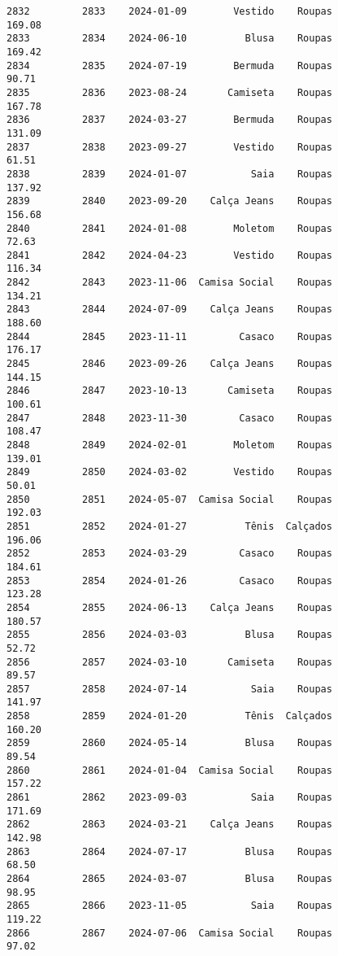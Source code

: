 \documentclass[11pt]{article}
\begin{document}
\begin{Verbatim}[commandchars=\\\{\}]
2832         2833    2024-01-09        Vestido    Roupas          169.08   
2833         2834    2024-06-10          Blusa    Roupas          169.42   
2834         2835    2024-07-19        Bermuda    Roupas           90.71   
2835         2836    2023-08-24       Camiseta    Roupas          167.78   
2836         2837    2024-03-27        Bermuda    Roupas          131.09   
2837         2838    2023-09-27        Vestido    Roupas           61.51   
2838         2839    2024-01-07           Saia    Roupas          137.92   
2839         2840    2023-09-20    Calça Jeans    Roupas          156.68   
2840         2841    2024-01-08        Moletom    Roupas           72.63   
2841         2842    2024-04-23        Vestido    Roupas          116.34   
2842         2843    2023-11-06  Camisa Social    Roupas          134.21   
2843         2844    2024-07-09    Calça Jeans    Roupas          188.60   
2844         2845    2023-11-11         Casaco    Roupas          176.17   
2845         2846    2023-09-26    Calça Jeans    Roupas          144.15   
2846         2847    2023-10-13       Camiseta    Roupas          100.61   
2847         2848    2023-11-30         Casaco    Roupas          108.47   
2848         2849    2024-02-01        Moletom    Roupas          139.01   
2849         2850    2024-03-02        Vestido    Roupas           50.01   
2850         2851    2024-05-07  Camisa Social    Roupas          192.03   
2851         2852    2024-01-27          Tênis  Calçados          196.06   
2852         2853    2024-03-29         Casaco    Roupas          184.61   
2853         2854    2024-01-26         Casaco    Roupas          123.28   
2854         2855    2024-06-13    Calça Jeans    Roupas          180.57   
2855         2856    2024-03-03          Blusa    Roupas           52.72   
2856         2857    2024-03-10       Camiseta    Roupas           89.57   
2857         2858    2024-07-14           Saia    Roupas          141.97   
2858         2859    2024-01-20          Tênis  Calçados          160.20   
2859         2860    2024-05-14          Blusa    Roupas           89.54   
2860         2861    2024-01-04  Camisa Social    Roupas          157.22   
2861         2862    2023-09-03           Saia    Roupas          171.69   
2862         2863    2024-03-21    Calça Jeans    Roupas          142.98   
2863         2864    2024-07-17          Blusa    Roupas           68.50   
2864         2865    2024-03-07          Blusa    Roupas           98.95   
2865         2866    2023-11-05           Saia    Roupas          119.22   
2866         2867    2024-07-06  Camisa Social    Roupas           97.02   

\end{Verbatim}
\end{document}
